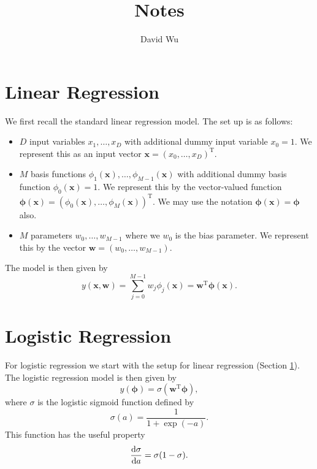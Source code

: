 \documentclass[11pt]{amsart}
\theoremstyle{definition}
\theoremstyle{remark}
\newcommand{\vect}[1]{\mathbf{#1}}
\newcommand{\transpose}{\text{T}}
\begin{document}
\pagestyle{plain}

\title{Notes}
\author{David Wu}

\maketitle

\tableofcontents

\section{Linear Regression}\label{s:linear_regression}
    We first recall the standard linear regression model. The set up is as follows:
    \begin{itemize}
        \item $D$ input variables $x_1, \dots, x_D$ with additional dummy input variable $x_0 = 1$. We represent this as an input vector $\vect{x} = (x_0, \dots, x_D)^\transpose$.
        \item $M$ basis functions $\phi_1(\vect{x}), \dots, \phi_{M-1}(\vect{x})$ with additional dummy basis function $\phi_0(\vect{x}) = 1$. We represent this by the vector-valued function $\bm{\phi}(\vect{x}) = (\phi_0(\vect{x}), \dots, \phi_M(\vect{x}))^\transpose$. We may use the notation $\bm{\phi}(\vect{x}) = \bm{\phi}$ also.
        \item $M$ parameters $w_0, \dots, w_{M-1}$ where we $w_0$ is the bias parameter. We represent this by the vector $\vect{w} = (w_0, \dots, w_{M-1})$.
    \end{itemize}
    The model is then given by
    \begin{equation*}
        y(\vect{x}, \vect{w}) = \sum_{j=0}^{M-1} w_j \phi_j(\vect{x}) = \vect{w}^\transpose \bm{\phi}(\vect{x}).
    \end{equation*}
\section{Logistic Regression}\label{s:logistic_regression}
    For logistic regression we start with the setup for linear regression (Section \ref{s:linear_regression}). The logistic regression model is then given by 
    \begin{equation*}
        y(\bm{\phi}) = \sigma(\vect{w}^\transpose \bm{\phi}),
    \end{equation*}
    where $\sigma$ is the logistic sigmoid function defined by
    \begin{equation*}
        \sigma(a) = \frac{1}{1 + \exp(-a)}.
    \end{equation*}
    This function has the useful property
    \begin{equation*}
        \dv{\sigma}{a} = \sigma(1 - \sigma).
    \end{equation*}
    
\end{document}
